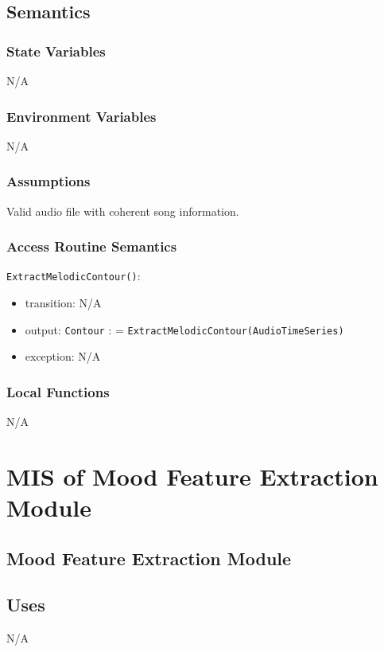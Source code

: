 \documentclass[12pt, titlepage]{article}
\begin{document}
\subsection{Semantics}

\subsubsection{State Variables}
N/A

\subsubsection{Environment Variables}
N/A

\subsubsection{Assumptions}
Valid audio file with coherent song information.

\subsubsection{Access Routine Semantics}

\noindent \texttt{ExtractMelodicContour()}:
\begin{itemize}
\item transition: N/A 
\item output: \texttt{Contour} : = \texttt{ExtractMelodicContour(Audio\textunderscore Time\textunderscore Series)}
\item exception: N/A
\end{itemize}

\subsubsection{Local Functions}
N/A

\section{MIS of Mood Feature Extraction Module} 

\subsection{Mood Feature Extraction Module}

\subsection{Uses}
N/A
\end{document}
